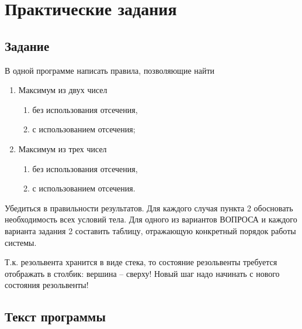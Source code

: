 \chapter{Практические задания}

\section{Задание}

В одной программе написать правила, позволяющие найти
\begin{enumerate}[label=\arabic*)]
    \item Максимум из двух чисел
        \begin{enumerate}[label=\alph*)]
            \item без использования отсечения,
            \item с использованием отсечения;
        \end{enumerate}
    \item Максимум из трех чисел
        \begin{enumerate}[label=\alph*)]
            \item без использования отсечения,
            \item с использованием отсечения.
        \end{enumerate}
\end{enumerate}

Убедиться в правильности результатов.  Для каждого случая пункта 2 обосновать
необходимость всех условий тела.  Для одного из вариантов ВОПРОСА и каждого
варианта задания 2 составить таблицу, отражающую конкретный порядок работы
системы. 

Т.к. резольвента хранится в виде стека, то состояние резольвенты
требуется отображать в столбик: вершина – сверху! Новый шаг надо начинать с
нового состояния резольвенты!

\clearpage
\section{Текст программы}



